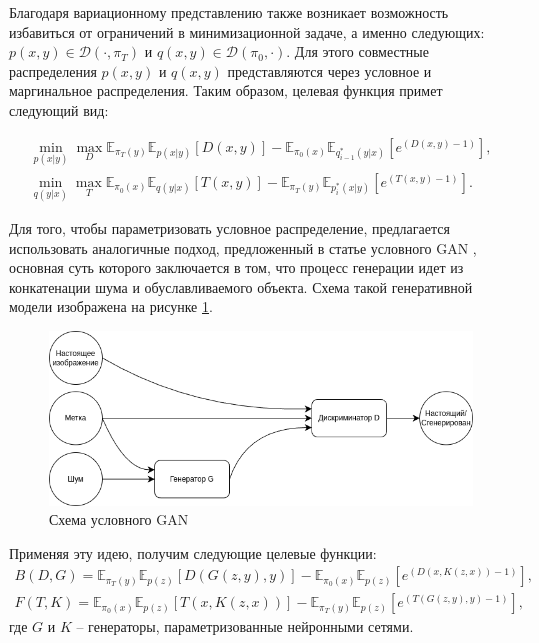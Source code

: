 Благодаря вариационному представлению также возникает возможность избавиться от ограничений в минимизационной задаче, а именно следующих: $p(x,y) \in \mathcal{D}(\cdot, \pi_T)$ и $q(x,y) \in \mathcal{D}(\pi_0, \cdot)$. Для этого совместные распределения $p(x,y)$ и $q(x,y)$ представляются через условное и маргинальное распределения. Таким образом, целевая функция примет следующий вид:

\begin{equation}
    \begin{split}
        \min_{p(x|y)}\max_{D}\mathbb{E}_{\pi_T(y)}\mathbb{E}_{p(x|y)}[D(x,y)] - \mathbb{E}_{\pi_0(x)}\mathbb{E}_{q^*_{i-1}(y|x)}\left[e^{(D(x,y) - 1)}\right], \\
        \min_{q(y|x)}\max_{T}\mathbb{E}_{\pi_0(x)}\mathbb{E}_{q(y|x)}[T(x,y)] - \mathbb{E}_{\pi_T(y)}\mathbb{E}_{p^*_{i}(x|y)}\left[e^{(T(x,y) - 1)}\right].
    \end{split}
\end{equation}

Для того, чтобы параметризовать условное распределение, предлагается использовать аналогичные подход, предложенный в статье условного GAN \cite{cond-gan}, основная суть которого заключается в том, что процесс генерации идет из конкатенации шума и обуславливаемого объекта. Схема такой генеративной модели изображена на рисунке \ref{fig:cond-gan}.

\begin{figure}
    \centering
    \includegraphics[width=0.75\linewidth]{images/cond_gan.png}
    \caption{Схема условного GAN}
    \label{fig:cond-gan}
\end{figure}

Применяя эту идею, получим следующие целевые функции:
\begin{equation}
    \begin{split}
        B(D, G) = \mathbb{E}_{\pi_T(y)}\mathbb{E}_{p(z)}[D(G(z, y),y)] - \mathbb{E}_{\pi_0(x)}\mathbb{E}_{p(z)}\left[e^{(D(x, K(z, x)) - 1)}\right], \\
        F(T, K) = \mathbb{E}_{\pi_0(x)}\mathbb{E}_{p(z)}[T(x, K(z, x))] - \mathbb{E}_{\pi_T(y)}\mathbb{E}_{p(z)}\left[e^{(T(G(z, y),y) - 1)}\right],
    \end{split}
    \label{eq:objective}
\end{equation}
где $G$ и $K$ -- генераторы, параметризованные нейронными сетями.

